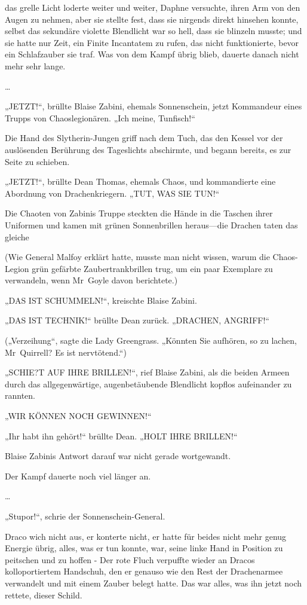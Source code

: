 {das grelle Licht loderte weiter und weiter, Daphne versuchte, ihren Arm von den Augen zu nehmen, aber sie stellte fest, dass sie nirgends direkt hinsehen konnte, selbst das sekundäre violette Blendlicht war so hell, dass sie blinzeln musste; und sie hatte nur Zeit, ein Finite Incantatem zu rufen, das nicht funktionierte, bevor ein Schlafzauber sie traf. Was von dem Kampf übrig blieb, dauerte danach nicht mehr sehr lange.

…

„JETZT!“, brüllte Blaise Zabini, ehemals Sonnenschein, jetzt Kommandeur eines Trupps von Chaoslegionären. „Ich meine, Tunfisch!“

Die Hand des Slytherin-Jungen griff nach dem Tuch, das den Kessel vor der auslösenden Berührung des Tageslichts abschirmte, und begann bereits, es zur Seite zu schieben.

„JETZT!“, brüllte Dean Thomas, ehemals Chaos, und kommandierte eine Abordnung von Drachenkriegern. „TUT, WAS SIE TUN!“

Die Chaoten von Zabinis Truppe steckten die Hände in die Taschen ihrer Uniformen und kamen mit grünen Sonnenbrillen heraus—die Drachen taten das gleiche

(Wie General Malfoy erklärt hatte, musste man nicht wissen, warum die Chaos-Legion grün gefärbte Zaubertrankbrillen trug, um ein paar Exemplare zu verwandeln, wenn Mr~Goyle davon berichtete.)

„DAS IST SCHUMMELN!“, kreischte Blaise Zabini.

„DAS IST TECHNIK!“ brüllte Dean zurück. „DRACHEN, ANGRIFF!“

(„Verzeihung“, sagte die Lady Greengrass. „Könnten Sie aufhören, so zu lachen, Mr~Quirrell? Es ist nervtötend.“)

„SCHIE?T AUF IHRE BRILLEN!“, rief Blaise Zabini, als die beiden Armeen durch das allgegenwärtige, augenbetäubende Blendlicht kopflos aufeinander zu rannten.

„WIR KÖNNEN NOCH GEWINNEN!“

„Ihr habt ihn gehört!“ brüllte Dean. „HOLT IHRE BRILLEN!“

Blaise Zabinis Antwort darauf war nicht gerade wortgewandt.

Der Kampf dauerte noch viel länger an.

…

„Stupor!“, schrie der Sonnenschein-General.

Draco wich nicht aus, er konterte nicht, er hatte für beides nicht mehr genug Energie übrig, alles, was er tun konnte, war, seine linke Hand in Position zu peitschen und zu hoffen - Der rote Fluch verpuffte wieder an Dracos kolloportiertem Handschuh, den er genauso wie den Rest der Drachenarmee verwandelt und mit einem Zauber belegt hatte. Das war alles, was ihn jetzt noch rettete, dieser Schild.

}
